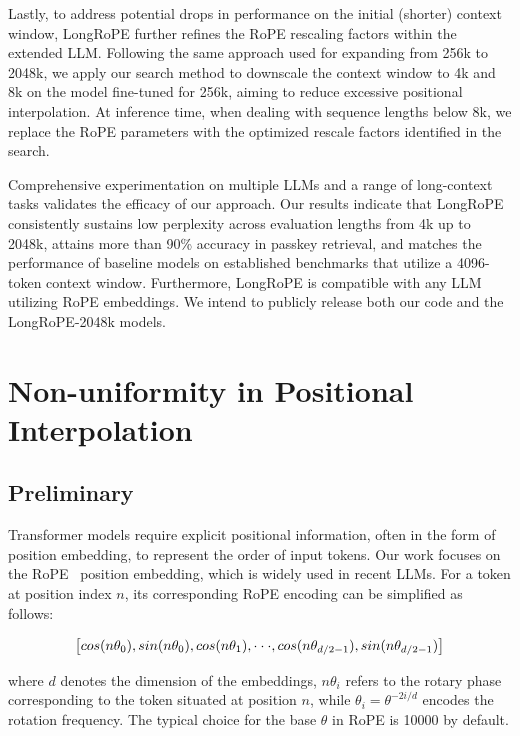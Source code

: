 Lastly, to address potential drops in performance on the initial (shorter) context window, {LongRoPE} further refines the RoPE rescaling factors within the extended LLM. Following the same approach used for expanding from 256k to 2048k, we apply our search method to downscale the context window to 4k and 8k on the model fine-tuned for 256k, aiming to reduce excessive positional interpolation. At inference time, when dealing with sequence lengths below 8k, we replace the RoPE parameters with the optimized rescale factors identified in the search.

Comprehensive experimentation on multiple LLMs and a range of long-context tasks validates the efficacy of our approach. Our results indicate that LongRoPE consistently sustains low perplexity across evaluation lengths from 4k up to 2048k, attains more than 90\% accuracy in passkey retrieval, and matches the performance of baseline models on established benchmarks that utilize a 4096-token context window. Furthermore, LongRoPE is compatible with any LLM utilizing RoPE embeddings. We intend to publicly release both our code and the LongRoPE-2048k models.

\section{Non-uniformity in Positional Interpolation}
\label{sec:analysis}

\subsection{Preliminary}

Transformer models require explicit positional information, often in the form of position embedding, to represent the order of input tokens. Our work focuses on the RoPE~\cite{rope} position embedding, which is widely used in recent  LLMs. For a token at position index $n$, its corresponding RoPE encoding can be simplified as follows:

\begin{equation}
		\fontsize{7.8}{7.8} \selectfont
	\label{eq:rope}
	\left[ cos(n\theta_0), sin(n\theta_0), cos(n\theta_1), \cdot\cdot\cdot, cos(n\theta_{d/2-1}), sin(n\theta_{d/2-1}) \right]   
\end{equation}

where $d$ denotes the dimension of the embeddings, 
$n\theta_i$ refers to the rotary phase corresponding to the token situated at position $n$, 
while $\theta_i=\theta^{-2i/d}$ encodes the rotation frequency. The typical choice for the base $\theta$ in RoPE is 10000 by default.


